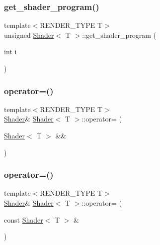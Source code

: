 \mbox{\label{classShader_a2c19b216850480109f9d5f7ed6ab6aa6}} 
\subsubsection{\texorpdfstring{get\+\_\+shader\+\_\+program()}{get\_shader\_program()}\hspace{0.1cm}{\footnotesize\ttfamily [2/2]}}
{\footnotesize\ttfamily template$<$R\+E\+N\+D\+E\+R\+\_\+\+T\+Y\+PE T$>$ \\
unsigned \mbox{\hyperlink{classShader}{Shader}}$<$ T $>$\+::get\+\_\+shader\+\_\+program (\begin{DoxyParamCaption}\item[{int}]{i }\end{DoxyParamCaption})\hspace{0.3cm}{\ttfamily [inline]}}

\mbox{\label{classShader_a3b92fece66095389581a2bf6b3124657}} 
\subsubsection{\texorpdfstring{operator=()}{operator=()}\hspace{0.1cm}{\footnotesize\ttfamily [1/4]}}
{\footnotesize\ttfamily template$<$R\+E\+N\+D\+E\+R\+\_\+\+T\+Y\+PE T$>$ \\
\mbox{\hyperlink{classShader}{Shader}}\& \mbox{\hyperlink{classShader}{Shader}}$<$ T $>$\+::operator= (\begin{DoxyParamCaption}\item[{\mbox{\hyperlink{classShader}{Shader}}$<$ T $>$ \&\&}]{ }\end{DoxyParamCaption})\hspace{0.3cm}{\ttfamily [delete]}}

\mbox{\label{classShader_a58f724fecccecdb1633e08ce0258da37}} 
\subsubsection{\texorpdfstring{operator=()}{operator=()}\hspace{0.1cm}{\footnotesize\ttfamily [2/4]}}
{\footnotesize\ttfamily template$<$R\+E\+N\+D\+E\+R\+\_\+\+T\+Y\+PE T$>$ \\
\mbox{\hyperlink{classShader}{Shader}}\& \mbox{\hyperlink{classShader}{Shader}}$<$ T $>$\+::operator= (\begin{DoxyParamCaption}\item[{const \mbox{\hyperlink{classShader}{Shader}}$<$ T $>$ \&}]{ }\end{DoxyParamCaption})\hspace{0.3cm}{\ttfamily [delete]}}

